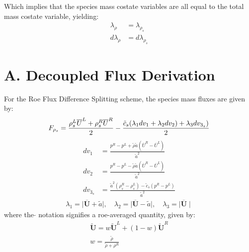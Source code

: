 \documentclass{article}   	%
\begin{document}
Which implies that the species mass costate variables are all equal to the total mass costate variable, yielding:
\begin{align}
  \lambda_{\rho} &= \lambda_{\rho_s} \\
  d \lambda_{\rho} &= d \lambda_{\rho_s}
  \label{final_result}
\end{align}
\pagebreak
\section*{A. Decoupled Flux Derivation}

For the Roe Flux Difference Splitting scheme, the species mass fluxes are given
by:
\begin{equation}
	F_{\rho_s} = \frac{\rho_s^L\overline{U}^L+\rho_s^R\overline{U}^R}{2}
	-\frac{\tilde{c}_s(\lambda_1 dv_1 + \lambda_2 dv_2)+\lambda_3 dv_{3_s})}{2}
  \label{species_mass} \\
\end{equation}
\begin{align}	
		dv_1 &= \frac{p^R-p^L+\tilde{\rho} \tilde{a} (\overline{U}^R-\overline{U}^L)}{\tilde{a}^2} \\
		dv_2 &= \frac{p^R-p^L-\tilde{\rho} \tilde{a} (\overline{U}^R-\overline{U}^L)}{\tilde{a}^2} \\
		dv_{3_s} &= \frac{\tilde{a}^2 (\rho_s^R-\rho_s^L)- \tilde{c}_s (p^R-p^L)}{\tilde{a}^2}
\end{align}
\begin{align}
	\lambda_1 = \mid\mathbf{\overline{U}}+\tilde{a} \mid,\quad 
	\lambda_2 = \mid \mathbf{\overline{U}}-\tilde{a} \mid,\quad 
	\lambda_3 =  \mid \mathbf{\overline{U}} \mid
\end{align}
where the $\tilde{}$ notation signifies a roe-averaged quantity, given by:
\begin{gather}
	\mathbf{\tilde{U}} =w\mathbf{\tilde{U}}^L+(1-w)\mathbf{\tilde{U}}^R \\
	w = \frac{\tilde{\rho}}{\tilde{\rho}+\rho^R}
\end{gather}
\end{document}
